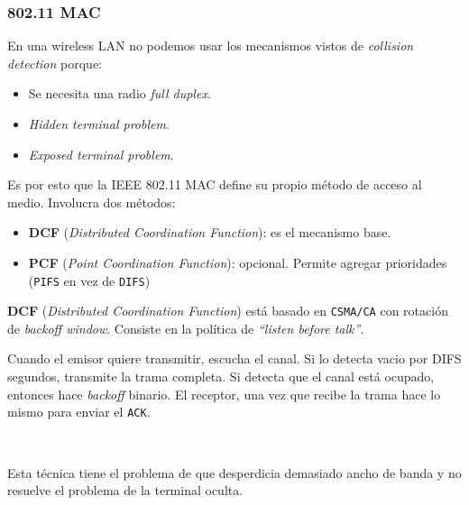 \documentclass[]{article}
\begin{document}
\subsubsection{802.11 MAC}
En una wireless LAN no podemos usar los mecanismos vistos de \emph{collision detection} porque:
\begin{itemize}
    \item Se necesita una radio \emph{full duplex}.
    \item \emph{Hidden terminal problem}.
    \item \emph{Exposed terminal problem}.
\end{itemize}

Es por esto que la IEEE 802.11 MAC define su propio método de acceso al medio. Involucra dos métodos:

\begin{itemize}
    \item \textbf{DCF} (\emph{Distributed Coordination Function}): es el mecanismo base.
    \item \textbf{PCF} (\emph{Point Coordination Function}): opcional. Permite agregar prioridades (\texttt{PIFS} en vez de \texttt{DIFS})
\end{itemize}



\textbf{DCF} (\emph{Distributed Coordination Function}) está basado en \texttt{CSMA/CA} con rotación de \emph{backoff window}. Consiste en la política de \emph{``listen before talk''}.

Cuando el emisor quiere transmitir, escucha el canal. Si lo detecta vacio por DIFS segundos, transmite la trama completa. Si detecta que el canal está ocupado, entonces hace \emph{backoff} binario. El receptor, una vez que recibe la trama hace lo mismo para enviar el \texttt{ACK}.

~\newline

Esta técnica tiene el problema de que desperdicia demasiado ancho de banda y no resuelve el problema de la terminal oculta.
\end{document}
